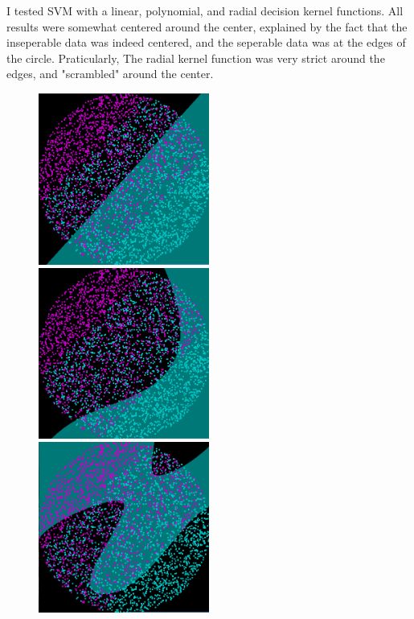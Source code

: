 \documentclass[a4paper]{article}
\begin{document}
\newpage

I tested SVM with a linear, polynomial, and radial decision kernel functions.
All results were somewhat centered around the center, explained by the fact
that the inseperable data was indeed centered, and the seperable data was at
the edges of the circle. Praticularly, The radial kernel function was very strict
around the edges, and "scrambled" around the center.

\begin{figure}[h!]
    \includegraphics[width=0.5\textwidth]{images/svm_linear.png}
    \includegraphics[width=0.5\textwidth]{images/svm_poly.png}
    \includegraphics[width=0.5\textwidth]{images/svm_radial.png}
\end{figure}
\end{document}
